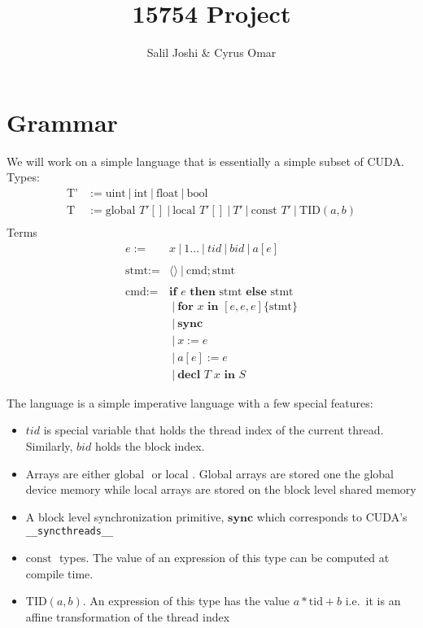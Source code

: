 \documentclass{article}
\title{15754 Project}
\author{Salil Joshi \& Cyrus Omar}
\newcommand{\nil}{\langle\rangle}
\newcommand{\Global}{\text{global }}
\newcommand{\local}{\text{local }}
\newcommand{\const}{\text{const }}
\newcommand{\tid}[2]{\text{TID}(#1, #2)}
\newcommand{\Ifte}[3]{\textbf{if } #1 \textbf{ then } #2 \textbf{ else } #3}
\newcommand{\for}[5]{\textbf{for } #1 \textbf{ in } [#2, #3, #4] \{#5\}}
\newcommand{\sync}{\textbf{sync}}
\newcommand{\decl}[3]{\textbf{decl } #1\; #2 \textbf{ in } #3}
\renewcommand{\|}{\:|\:}
\begin{document}
\maketitle
\section{Grammar}
We will work on a simple language that is essentially a simple subset of CUDA.
Types:
  \begin{align*}
    \text{T'} &:=  \text{uint} \| \text{int} \| \text{float} \| \text{bool} \\
    \text{T} &:= \Global T' [] \| \local T' [] \| T' \| \const T' \| \tid{a}{b} \\
  \end{align*}
Terms
  \begin{align*}
    e := & x \| 1\ldots \| tid \| bid \| a[e] \\
     & \\
    \text{stmt} := & \nil \| \text{cmd}; \text{stmt}\\
     & \\
    \text{cmd} := & \Ifte{e}{\text{stmt}}{\text{stmt}} \\
                  & \| \for{x}{e}{e}{e}{\text{stmt}} \\
                  & \| \sync \\
                  & \| x := e \\
                  & \| a[e] := e \\
                  & \| \decl{T}{x}{S}
  \end{align*}

The language is a simple imperative language with a few special features:
\begin{itemize}
  \item $tid$ is special variable that holds the thread index of the current thread. Similarly, $bid$ holds the block index.
  \item Arrays are either $\Global$ or $\local$. Global arrays are stored one the global device memory while local arrays are stored on the block level shared memory
  \item A block level synchronization primitive, $\sync$ which corresponds to CUDA's \texttt{\_\_syncthreads\_\_}
  \item $\const$ types. The value of an expression of this type can be computed at compile time.
  \item $\tid{a}{b}$. An expression of this type has the value $a*\text{tid} + b$ i.e.\ it is an affine transformation of the thread index
\end{itemize}
\end{document}
